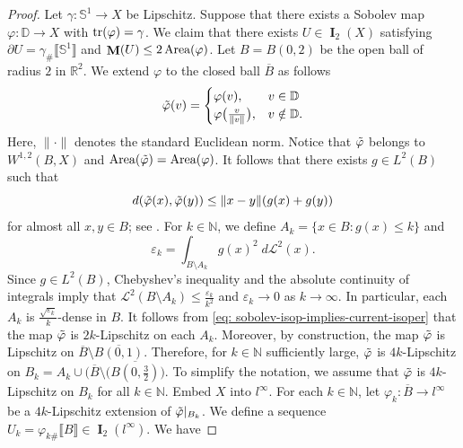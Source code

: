 \documentclass{amsart}
\numberwithin{equation}{section}
\newcommand{\R}{\mathbb{R}}
\newcommand{\N}{\mathbb{N}}
\newcommand{\leb}{\mathcal{L}}
\DeclareMathOperator{\bI}{\mathbf{I}}
\DeclareMathOperator{\bM}{\mathbf{M}}
\DeclareMathOperator{\trace}{\textup{tr}}
\DeclareMathOperator{\area}{\textup{Area}}
\newcommand{\bb}[1]{\llbracket #1\rrbracket}
\newcommand{\norm}[1]{\lVert#1\rVert}
\begin{document}
        \begin{proof}
            Let $\gamma\colon \mathbb{S}^1 \to X$ be Lipschitz. Suppose that there exists a Sobolev map $\varphi \colon \mathbb{D}\to X$ with $\trace (\varphi) = \gamma$. We claim that there exists $U \in \bI_2(X)$ satisfying $\partial U = \gamma_\#\bb{\mathbb{S}^1}$ and $\bM(U) \leq 2 \area(\varphi)$. Let $B = B(0,2)$ be the open ball of radius $2$ in $\R^2$. We extend $\varphi$ to the closed ball $\overline{B}$ as follows
            $$
            \Tilde{\varphi}(v) =
            \begin{cases}
            \varphi(v), &v \in \mathbb{D}\\
            \varphi\big( \frac{v}{\norm{v}}\big),  &v \notin \mathbb{D}.
            \end{cases}
            $$
            Here, $\norm{\cdot}$ denotes the standard Euclidean norm. Notice that $\Tilde{\varphi}$ belongs to $W^{1,2}(B,X)$ and $\area(\Tilde{\varphi})=\area(\varphi)$. It follows that there exists $g \in L^2(B)$ such that 
            \begin{equation}\label{eq: sobolev-isop-implies-current-isoper}
                d(\Tilde{\varphi}(x),\Tilde{\varphi}(y) )\leq \norm{x-y} (g(x)+g(y))
            \end{equation}
            for almost all $x,y \in B$; see \cite[Theorem 8.1.7]{Heinonen-Koskela-Shanmugalingam-Tyson-2015}. For $k \in \N$, we define $A_k = \{ x \in B \colon g(x) \leq k\}$ and
            $$\varepsilon_k = \int_{B \setminus A_k} g(x)^2 \; d\leb^2(x).$$
            Since $g \in L^2(B)$, Chebyshev’s inequality and the absolute continuity of integrals imply that $\leb^2(B\setminus A_k) \leq \frac{\varepsilon_k}{k^2}$ and $\varepsilon_k \to 0$ as $k \to \infty$. In particular, each $A_k$ is $\frac{\sqrt{\varepsilon_k}}{k}$-dense in $B$. It follows from \eqref{eq: sobolev-isop-implies-current-isoper} that the map $\Tilde{\varphi}$ is $2k$-Lipschitz on each $A_k$. Moreover, by construction, the map $\Tilde{\varphi}$ is Lipschitz on $\overline{B}\setminus \overline{B(0,1)}$. Therefore, for $k\in \N$ sufficiently large, $\Tilde{\varphi}$ is $4k$-Lipschitz on $B_k = A_k \cup \big( \overline{B}\setminus (\overline{B(0,\frac{3}{2})}\big)$. To simplify the notation, we assume that $\Tilde{\varphi}$ is $4k$-Lipschitz on $B_k$ for all $k \in \N$. Embed $X$ into $l^\infty$. For each $k \in \N$, let $\varphi_k \colon \overline{B} \to l^\infty$ be a $4k$-Lipschitz extension of $\Tilde{\varphi}|_{B_k}$. We define a sequence $U_k = \varphi_{k\#} \bb{B} \in \bI_2(l^\infty)$. We have

\end{proof}
\end{document}
